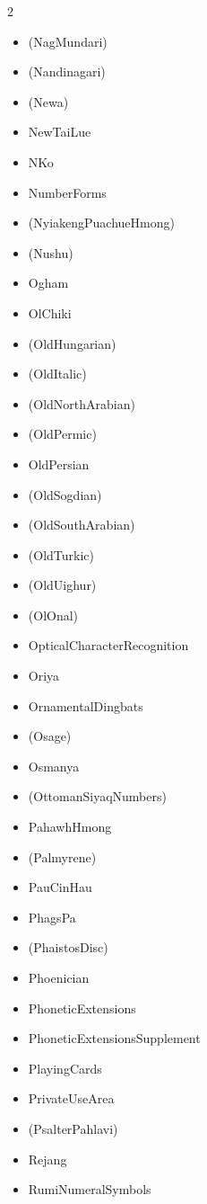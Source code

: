 \documentclass{article}
\newenvironment{itemlist}{%
  \begin{itemize}
  \setlength{\itemsep}{0pt}
  \setlength{\parsep}{0pt}
  \setlength{\topsep}{0pt}
  \setlength{\partopsep}{0pt}
  \setlength{\parskip}{0pt}
  \setlength{\labelsep}{5pt}}%
{
  \end{itemize}}
\begin{document}
\begin{multicols*}{2}
\begin{itemlist}
        \item (NagMundari)
        \item (Nandinagari)
        \item (Newa)
        \item NewTaiLue
        \item NKo
        \item NumberForms
        \item (NyiakengPuachueHmong)
        \item (Nushu)
        \item Ogham
        \item OlChiki
        \item (OldHungarian)
        \item (OldItalic)
        \item (OldNorthArabian)
        \item (OldPermic)
        \item OldPersian
        \item (OldSogdian)
        \item (OldSouthArabian)
        \item (OldTurkic)
        \item (OldUighur)
        \item (OlOnal)
        \item OpticalCharacterRecognition
        \item Oriya
        \item OrnamentalDingbats
        \item (Osage)
        \item Osmanya
        \item (OttomanSiyaqNumbers)
        \item PahawhHmong
        \item (Palmyrene)
        \item PauCinHau
        \item PhagsPa
        \item (PhaistosDisc)
        \item Phoenician
        \item PhoneticExtensions
        \item PhoneticExtensionsSupplement
        \item PlayingCards
        \item PrivateUseArea
        \item (PsalterPahlavi)
        \item Rejang
        \item RumiNumeralSymbols

\end{itemlist}
\end{multicols*}
\end{document}
